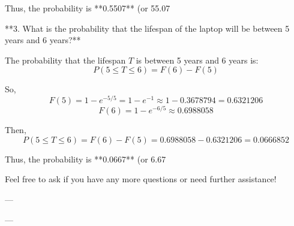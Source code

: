 Thus, the probability is **0.5507** (or 55.07%

**3. What is the probability that the lifespan of the laptop will be between 5 years and 6 years?**

The probability that the lifespan $ T $ is between 5 years and 6 years is:
$$P(5 \leq T \leq 6) = F(6) - F(5)$$

So,
$$F(5) = 1 - e^{-5/5} = 1 - e^{-1} \approx 1 - 0.3678794 = 0.6321206$$
$$F(6) = 1 - e^{-6/5} \approx 0.6988058$$

Then,
$$P(5 \leq T \leq 6) = F(6) - F(5) = 0.6988058 - 0.6321206 = 0.0666852$$

Thus, the probability is **0.0667** (or 6.67%

Feel free to ask if you have any more questions or need further assistance!

---

---	
